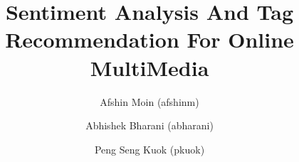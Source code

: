 \documentclass[11pt]{llncs}
\begin{document}
\pagestyle{empty} 
\title{Sentiment Analysis And Tag Recommendation For Online MultiMedia}
\author{Afshin Moin (afshinm)\institute{}
\and
Abhishek Bharani (abharani)\institute{}
\and 
Peng Seng Kuok (pkuok)\institute{}
}

\maketitle






\pagestyle{plain}


\end{document}

